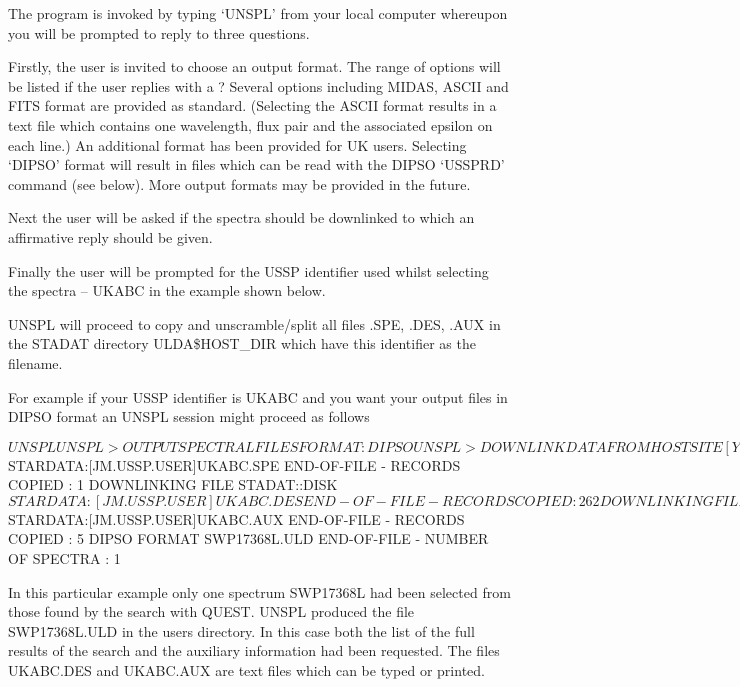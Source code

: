 \documentclass[11pt,nolof,noabs]{starlink}
\begin{document}
The program is invoked by typing `UNSPL' from your local computer whereupon
you will be prompted to reply to three questions.

Firstly, the user is invited to choose an output format.
The range of options will be listed if the user replies with a ?
Several options including MIDAS, ASCII and FITS format are provided as standard.
(Selecting the ASCII format results in a text file which contains one
wavelength,
flux pair and the associated epsilon on each line.)
An additional format has been provided for UK users.
Selecting `DIPSO' format will result in files which can be read with the DIPSO
`USSPRD' command (see below).
More output formats may be provided in the future.

Next the user will be asked if the spectra should be downlinked to which an
affirmative reply should be given.

Finally the user will be prompted for the USSP identifier used whilst
selecting the spectra -- UKABC in the example shown below.

UNSPL will proceed to copy and unscramble/split all files .SPE, .DES, .AUX
in the STADAT directory ULDA\$HOST\_DIR which have this identifier
as the filename.

For example if your USSP identifier is UKABC and you want your output files in
DIPSO format an UNSPL session might proceed as follows
\begin{terminalv}
$ UNSPL

 UNSPL> OUTPUT SPECTRAL FILES FORMAT : DIPSO
 UNSPL> DOWNLINK DATA FROM HOST SITE [Y/N] ?Y
 UNSPL> USSP USER IDENTIFICATION : UKABC
 DOWNLINKING FILE STADAT::DISK$STARDATA:[JM.USSP.USER]UKABC.SPE
                        END-OF-FILE - RECORDS COPIED :   1
 DOWNLINKING FILE STADAT::DISK$STARDATA:[JM.USSP.USER]UKABC.DES
                        END-OF-FILE - RECORDS COPIED : 262
 DOWNLINKING FILE STADAT::DISK$STARDATA:[JM.USSP.USER]UKABC.AUX
                        END-OF-FILE - RECORDS COPIED :   5
                            DIPSO FORMAT SWP17368L.ULD
                        END-OF-FILE - NUMBER OF SPECTRA :   1
\end{terminalv}
In this particular example only one spectrum SWP17368L had been selected
from those found by the search with QUEST.
UNSPL produced the file SWP17368L.ULD in the users directory.
In this case both the list of the full results of the search and the
auxiliary information  had been requested.
The files UKABC.DES and UKABC.AUX are text files which can be typed or printed.
\end{document}
